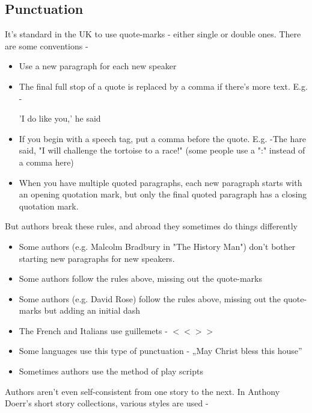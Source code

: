 \documentclass[11pt]{article}
\begin{document}
\subsection*{Punctuation}
It's standard in the UK to use quote-marks - either single or double ones. There are some conventions -
\begin{itemize}
\item Use a new paragraph for each new speaker
\item The final full stop of a quote is replaced by a comma if there's more text. E.g. -

'I do like you,' he said

\item If you begin with a speech tag, put a comma before the quote. E.g. -The hare said, "I will challenge the tortoise to a race!" (some people use a ":" instead of a comma here)
\item When you have multiple quoted paragraphs, each new paragraph starts with an opening quotation mark, but only the final quoted paragraph has a closing quotation mark.
\end{itemize}

But authors break these rules, and abroad they sometimes do things differently


\begin{itemize}
\item Some authors (e.g. Malcolm Bradbury in "The History Man") don't bother starting new paragraphs for new speakers.
\item Some authors follow the rules above, missing out the quote-marks
\item Some authors (e.g. David Rose) follow the rules above, missing out the quote-marks but adding an initial dash
\item The French and Italians use guillemets - $<< >>$
\item Some languages use this type of punctuation - „May Christ bless this house”
\item Sometimes authors use the method of play scripts
\end{itemize}
Authors aren't even self-consistent from one story to the next. In Anthony Doerr's short story collections, various styles are used -
\end{document}
